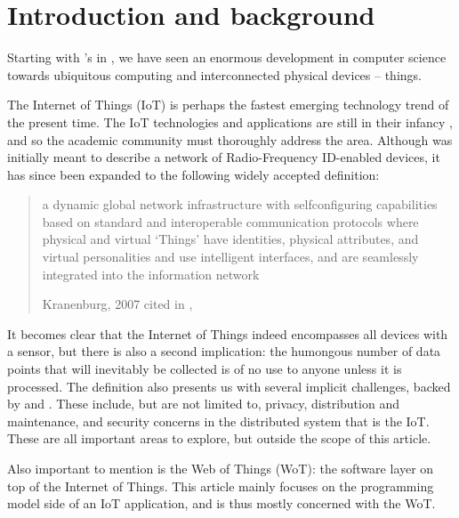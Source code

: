\section{Introduction and background}
Starting with \citeauthor{weiser:the-computer-for-the-21st-century:1991}'s  in \citeyear{weiser:the-computer-for-the-21st-century:1991}, we have seen an enormous development in computer science towards ubiquitous computing and interconnected physical devices -- things.

The Internet of Things (IoT) is perhaps the fastest emerging technology trend of the present time. The IoT technologies and applications are still in their infancy \autocite{xu-he-li:internet-of-things-in-industries-a-survey:2014}, and so the academic community must thoroughly address the area. Although  was initially meant to describe a network of Radio-Frequency ID-enabled devices, it has since been expanded to the following widely accepted \autocite{xu-he-li:internet-of-things-in-industries-a-survey:2014} definition:

\blockquote[{Kranenburg, 2007 cited in \citeauthor{xu-he-li:internet-of-things-in-industries-a-survey:2014}, \citeyear[1]{xu-he-li:internet-of-things-in-industries-a-survey:2014}}]{a dynamic global network infrastructure with selfconfiguring capabilities based on standard and interoperable communication protocols where physical and virtual ‘Things’ have identities, physical attributes, and virtual personalities and use intelligent interfaces, and are seamlessly integrated into the information network}.

It becomes clear that the Internet of Things indeed encompasses all devices with a sensor, but there is also a second implication: the humongous number of data points that will inevitably be collected is of no use to anyone unless it is processed. The definition also presents us with several implicit challenges, backed by \textcite{xu-he-li:internet-of-things-in-industries-a-survey:2014} and \textcite{palattella-accettura-vilajosana-watteyne-gieco-boggia-dohler:standardized-protocol-stack-for-the-internet-of-important-things:2012}. These include, but are not limited to, privacy, distribution and maintenance, and security concerns in the distributed system that is the IoT. These are all important areas to explore, but outside the scope of this article.

Also important to mention is the Web of Things (WoT): the software layer on top of the Internet of Things. This article mainly focuses on the programming model side of an IoT application, and is thus mostly concerned with the WoT.

